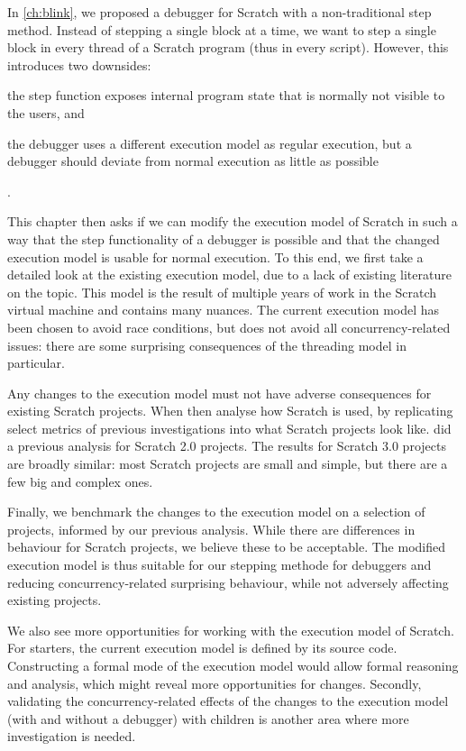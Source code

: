 \documentclass[../main]{subfiles}
\begin{document}
In \cref{ch:blink}, we proposed a debugger for Scratch with a non-traditional step method.
Instead of stepping a single block at a time, we want to step a single block in every thread of a Scratch program (thus in every script).
However, this introduces two downsides:
\begin{enumerate*}[label=\emph{\roman*})]
    \item the step function exposes internal program state that is normally not visible to the users, and
    \item the debugger uses a different execution model as regular execution, but a debugger should deviate from normal execution as little as possible
\end{enumerate*}.

This chapter then asks if we can modify the execution model of Scratch in such a way that the step functionality of a debugger is possible and that the changed execution model is usable for normal execution.
To this end, we first take a detailed look at the existing execution model, due to a lack of existing literature on the topic.
This model is the result of multiple years of work in the Scratch virtual machine and contains many nuances.
The current execution model has been chosen to avoid race conditions, but does not avoid all concurrency-related issues: there are some surprising consequences of the threading model in particular.

Any changes to the execution model must not have adverse consequences for existing Scratch projects.
When then analyse how Scratch is used, by replicating select metrics of previous investigations into what Scratch projects look like.
\Textcite{aivaloglouHowKidsCode2016} did a previous analysis for Scratch 2.0 projects.
The results for Scratch 3.0 projects are broadly similar: most Scratch projects are small and simple, but there are a few big and complex ones.

Finally, we benchmark the changes to the execution model on a selection of projects, informed by our previous analysis.
While there are differences in behaviour for Scratch projects, we believe these to be acceptable.
The modified execution model is thus suitable for our stepping methode for debuggers and reducing concurrency-related surprising behaviour, while not adversely affecting existing projects.

We also see more opportunities for working with the execution model of Scratch.
For starters, the current execution model is defined by its source code.
Constructing a formal mode of the execution model would allow formal reasoning and analysis, which might reveal more opportunities for changes.
Secondly, validating the concurrency-related effects of the changes to the execution model (with and without a debugger) with children is another area where more investigation is needed.
\end{document}
